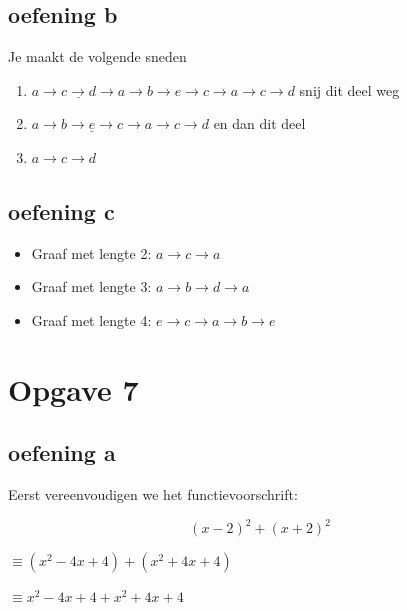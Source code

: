 \documentclass[11pt, a4paper]{article}
\begin{document}

\subsection*{oefening b}

Je maakt de volgende sneden

\begin{enumerate}
	\item $\underline{a \rightarrow c \rightarrow d \rightarrow a} \rightarrow b \rightarrow e \rightarrow c \rightarrow a \rightarrow c \rightarrow d$ \hfill snij dit deel weg
	\item $\underline{a \rightarrow b \rightarrow e \rightarrow c \rightarrow a} \rightarrow c \rightarrow d$ \hfill en dan dit deel
	\item $\boxed{a \rightarrow c \rightarrow d}$ \hfill
\end{enumerate}



\subsection*{oefening c}

\begin{itemize}
	\item Graaf met lengte 2: $a \rightarrow c \rightarrow a$
	\item Graaf met lengte 3: $a \rightarrow b \rightarrow d \rightarrow a$
	\item Graaf met lengte 4: $e \rightarrow c \rightarrow a \rightarrow b \rightarrow e$
\end{itemize}






\pagebreak
\section*{Opgave 7}

\subsection*{oefening a}

Eerst vereenvoudigen we het functievoorschrift:

\[
{(x-2)}^2 + {(x+2)}^2
\]

$\equiv (x^2 -4x +4) + (x^2 + 4x + 4)$

$\equiv x^2 -4x +4 + x^2 + 4x + 4$
\end{document}
